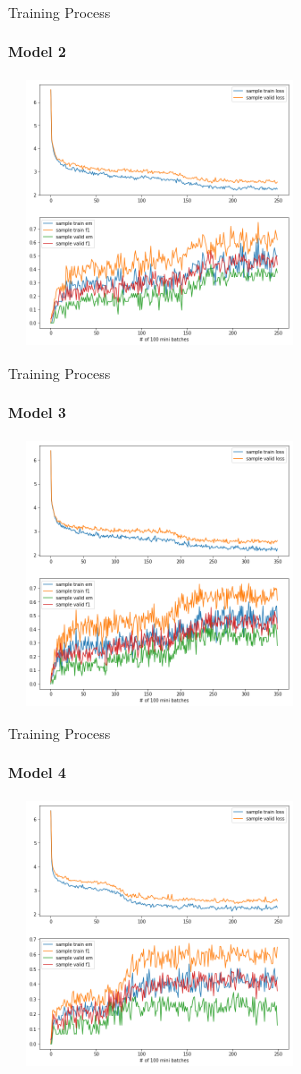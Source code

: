 \documentclass{beamer}
\begin{document}
\begin{frame}{Training Process}\framesubtitle{Model 2}
    \begin{center}
        \includegraphics[width=8cm, height=7cm]{figures/match_baseline.png}
    \end{center}
\end{frame}

\begin{frame}{Training Process}\framesubtitle{Model 3}
    \begin{center}
        \includegraphics[width=8cm, height=7cm]{figures/match_change1.png}
    \end{center}

\end{frame}

\begin{frame}{Training Process}\framesubtitle{Model 4}
    \begin{center}
        \includegraphics[width=8cm, height=7cm]{figures/match_change2.png}
    \end{center}

\end{frame}
\end{document}
